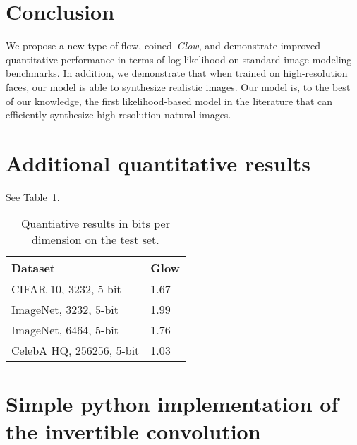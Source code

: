 \documentclass{article}
\begin{document}
\begin{comment}
 - Show random samples from face model
 - Show interpolations between faces
 - Show samples of not-deep-enough model with the deep model
 - Show manipulations of faces
\end{comment}

\section{Conclusion}

We propose a new type of flow, coined~\emph{Glow}, and demonstrate improved quantitative performance in terms of log-likelihood on standard image modeling benchmarks. In addition, we demonstrate that when trained on high-resolution faces, our model is able to synthesize realistic images. Our model is, to the best of our knowledge, the first likelihood-based model in the literature that can efficiently synthesize high-resolution natural images.

\smaller







\appendix
\normalsize

\section{Additional quantitative results}
See Table~\ref{tab:models:moreresults}.
\begin{table}[h]
    \centering
    \caption{Quantiative results in bits per dimension on the test set.}
    \label{tab:models:moreresults}
    \begin{tabular}{l | l}
    \toprule
    Dataset & Glow
    \\\midrule
    CIFAR-10, 3232, 5-bit & 1.67
    \\\midrule
    ImageNet, 3232, 5-bit & 1.99
    \\\midrule
    ImageNet, 6464, 5-bit & 1.76
    \\\midrule
    CelebA HQ, 256256, 5-bit & 1.03
    \\\bottomrule
    \end{tabular}
\end{table}

\section{Simple python implementation of the invertible  convolution}

\end{document}
